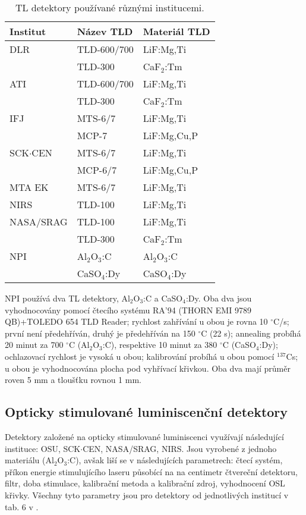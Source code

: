 \begin{table}[H]
  \def\arraystretch{0.8}
  \centering
  \caption{TL detektory používané různými institucemi. \cite{dosis}}
  \label{tab:dosis_pouzivaneTLD}
  \begin{tabular}{lll}
	\toprule
Institut&Název TLD&Materiál TLD\\
\midrule
DLR			 &TLD-600/700  &LiF:Mg,Ti\\
			 &TLD-300	   &CaF$_2$:Tm\\
ATI			 &TLD-600/700  &LiF:Mg,Ti\\
			 &TLD-300	   &CaF$_2$:Tm\\
IFJ			 &MTS-6/7	   &LiF:Mg,Ti\\
			 &MCP-7		   &LiF:Mg,Cu,P\\
SCK$\cdot$CEN&MTS-6/7	   &LiF:Mg,Ti\\
			 &MCP-6/7	   &LiF:Mg,Cu,P\\
MTA EK		 &MTS-6/7	   &LiF:Mg,Ti\\
NIRS		 &TLD-100	   &LiF:Mg,Ti\\
NASA/SRAG	 &TLD-100	   &LiF:Mg,Ti\\
			 &TLD-300	   &CaF$_2$:Tm\\
NPI			 &Al$_2$O$_3$:C&Al$_2$O$_3$:C\\
			 &CaSO$_4$:Dy  &CaSO$_4$:Dy\\
	\bottomrule
  \end{tabular}
\end{table}

NPI používá dva TL detektory, Al$_2$O$_3$:C a CaSO$_4$:Dy. Oba dva jsou vyhodnocovány pomocí čtecího systému RA’94 (THORN EMI 9789 QB)+TOLEDO 654 TLD Reader; rychlost zahřívání u obou je rovna 10 $^{\circ}$C/s; první není předehříván, druhý je předehříván na 150 $^{\circ}$C (22 s); annealing probíhá 20 minut za 700 $^{\circ}$C (Al$_2$O$_3$:C), respektive 10 minut za 380 $^{\circ}$C (CaSO$_4$:Dy); ochlazovací rychlost je vysoká u obou; kalibrování probíhá u obou pomocí $^{137}$Cs; u obou je vyhodnocována plocha pod vyhřívací křivkou. Oba dva mají průměr roven 5 mm a tloušťku rovnou 1 mm.
\subsection{Opticky stimulované luminiscenční detektory}
Detektory založené na opticky stimulované luminiscenci využívají následující instituce: OSU, SCK$\cdot$CEN, NASA/SRAG, NIRS. Jsou vyrobené z jednoho materiálu (Al$_2$O$_3$:C), avšak liší se v následujících parametrech: čtecí systém, příkon energie stimulujícího laseru působící na na centimetr čtvereční detektoru, filtr, doba stimulace, kalibrační metoda a kalibrační zdroj, vyhodnocení OSL křivky. Všechny tyto parametry jsou pro detektory od jednotlivých institucí v tab. 6 v \cite{dosis}. 
